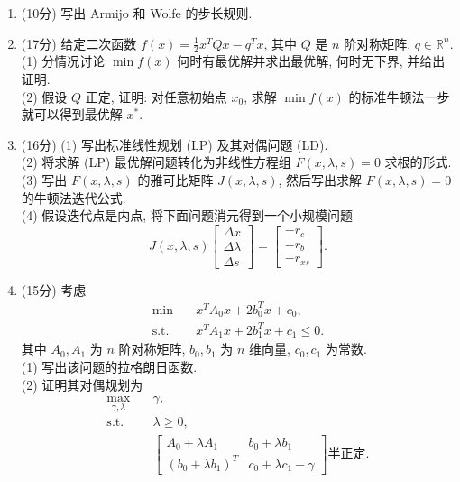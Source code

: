 \begin{enumerate}
    (1) 写出 (LP)' 的对偶规划.\\
    (2) 将矩阵 $A$ 的第 $j$ 列记为 $A_{\cdot j}$, 证明\textbf{标准线性规划 (LP) 的对偶规划}存在一个最优的 $p$ 使得 $p^TA_{\cdot j}<c_j$ 成立.
    \item (10分) 写出 Armijo 和 Wolfe 的步长规则.
    \item (17分) 给定二次函数 $f(x) = \frac12 x^T Q x - q^T x$, 其中 $Q$ 是 $n$ 阶对称矩阵, $q \in \mathbb{R}^n$.\\
    (1) 分情况讨论 $\min f(x)$ 何时有最优解并求出最优解, 何时无下界, 并给出证明.\\
    (2) 假设 $Q$ 正定, 证明: 对任意初始点 $x_0$, 求解 $\min f(x)$ 的标准牛顿法一步就可以得到最优解 $x^*$.
    \item (16分) (1) 写出标准线性规划 (LP) 及其对偶问题 (LD).\\
    (2) 将求解 (LP) 最优解问题转化为非线性方程组 $F(x, \lambda, s) = 0$ 求根的形式.\\
    (3) 写出  $F(x, \lambda, s)$ 的雅可比矩阵 $J(x, \lambda, s)$, 然后写出求解 $F(x, \lambda, s) = 0$ 的牛顿法迭代公式.\\
    (4) 假设迭代点是内点, 将下面问题消元得到一个小规模问题 $$J(x,\lambda,s)\begin{bmatrix}\Delta x \\ \Delta \lambda \\ \Delta s \end{bmatrix} = \begin{bmatrix} -r_c \\ -r_b \\ -r_{xs} \end{bmatrix}.$$
    \item (15分) 考虑 $$\begin{aligned}\min \quad & x^T A_0 x + 2 b_0^T x +c_0, \\ \text{s.t.} \quad & x^T A_1 x + 2 b_1^T x +c_1 \leq 0. \end{aligned}$$ 其中 $A_0, A_1$ 为 $n$ 阶对称矩阵, $b_0, b_1$ 为 $n$ 维向量, $c_0, c_1$ 为常数.\\
    (1) 写出该问题的拉格朗日函数.\\
    (2) 证明其对偶规划为 $$\begin{aligned} \max_{\gamma, \lambda} \quad &\gamma, \\ \text{s.t.} \quad & \lambda \geq 0, \\ & \begin{bmatrix} A_0+\lambda A_1 & b_0+\lambda b_1 \\ (b_0+\lambda b_1)^T & c_0+\lambda c_1 - \gamma \end{bmatrix}\text{半正定}. \end{aligned}$$
\end{enumerate}